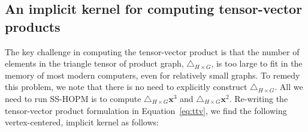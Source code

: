 \documentclass[10pt, journal, compsoc, final]{IEEEtran}
\newcommand{\bs}[1]{\boldsymbol{#1}}
\newcommand{\Vector}[1]{\bs{#1}}
\newcommand{\Tensor}[1]{\mathbf{\mathcal{#1}}}
\begin{document}
\subsection{An implicit kernel for computing tensor-vector products}
\label{sec:impTTV}

The key challenge in computing the tensor-vector product is that the number of elements in the triangle tensor of product graph, $\Tensor{\bigtriangleup}_{H \times G}$, is too large to fit in the memory of most modern computers, even for relatively small graphs. To remedy this problem, we note that there is no need to explicitly construct $\Tensor{\bigtriangleup}_{H \times G}$. All we need to run SS-HOPM is to compute $\Tensor{\bigtriangleup}_{H \times G}\Vector{x}^3$ and $\Tensor{\bigtriangleup}_{H \times G}\Vector{x}^2$. Re-writing the tensor-vector product formulation in Equation~\ref{eq:ttv}, we find the following vertex-centered, implicit kernel as follows:
\end{document}
